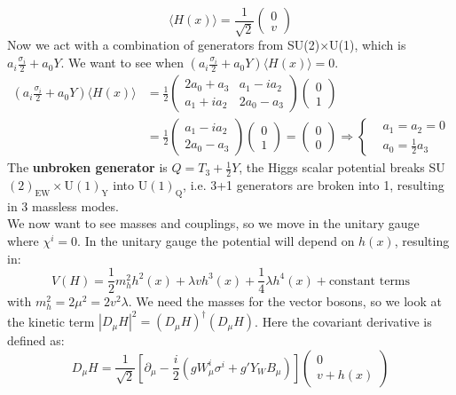 \documentclass[../main.tex]{subfiles}
\begin{document}
\[
\langle H(x)\rangle=\frac{1}{\sqrt{2}}\begin{pmatrix}
    0\\v
\end{pmatrix}
\]
Now we act with a combination of generators from SU(2)$\times$U(1), which is $a_i\frac{\sigma_i}{2}+a_0Y$. We want to see when $(a_i\frac{\sigma_i}{2}+a_0Y)\langle H(x)\rangle=0$.
\begin{align*}
\left(a_i\frac{\sigma_i}{2}+a_0Y\right)\langle H(x)\rangle&=\frac{1}{2}\left(\begin{array}{cc}
    2a_0+a_3 & a_1-ia_2 \\
    a_1+ia_2 & 2a_0-a_3
\end{array}\right)\begin{pmatrix}
    0\\1
\end{pmatrix}\\
&=\frac{1}{2}\begin{pmatrix}
    a_1-ia_2\\2a_0-a_3
\end{pmatrix}
\begin{pmatrix}
    0\\1
\end{pmatrix}=\begin{pmatrix}
    0\\0
\end{pmatrix}\Rightarrow\left\{\begin{aligned}
    &a_1=a_2=0\\
    &a_0=\frac{1}{2}a_3
\end{aligned}\right.
\end{align*}
The \textbf{unbroken generator} is $Q=T_3+\frac{1}{2}Y$, the Higgs scalar potential breaks SU$(2)_{\text{EW}}\times$U$(1)_{\text{Y}}$ into U$(1)_{\text{Q}}$, i.e. 3+1 generators are broken into 1, resulting in 3 massless modes.\\
We now want to see masses and couplings, so we move in the unitary gauge where $\chi^i=0$. In the unitary gauge the potential will depend on $h(x)$, resulting in:
\[
V(H)=\frac{1}{2}m_h^2h^2(x)+\lambda vh^3(x)+\frac{1}{4}\lambda h^4(x)+\text{constant terms}
\]
with $m_h^2=2\mu^2=2v^2\lambda$. We need the masses for the vector bosons, so we look at the kinetic term
$|D_\mu H|^2=(D_\mu H)^\dagger(D_\mu H)$. Here the covariant derivative is defined as:
\[
D_\mu H=\frac{1}{\sqrt{2}}\left[\partial_\mu-\frac{i}{2}(gW_\mu^i\sigma^i+g'Y_WB_\mu)\right]\begin{pmatrix}0 \\ v+h(x)\end{pmatrix}
\]
\end{document}

